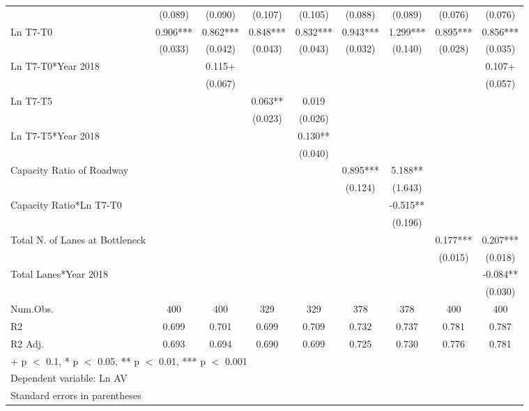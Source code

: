 \documentclass[
  letterpaper,
  authoryear]{elsarticle}
\begin{document}
\begin{table}
{\begin{tabular}[t]{lcccccccc}
 & (0.089) & (0.090) & (0.107) & (0.105) & (0.088) & (0.089) & (0.076) & (0.076)\\
Ln T7-T0 & 0.906*** & 0.862*** & 0.848*** & 0.832*** & 0.943*** & 1.299*** & 0.895*** & 0.856***\\
 & (0.033) & (0.042) & (0.043) & (0.043) & (0.032) & (0.140) & (0.028) & (0.035)\\
Ln T7-T0*Year 2018 &  & 0.115+ &  &  &  &  &  & 0.107+\\
 &  & (0.067) &  &  &  &  &  & (0.057)\\
Ln T7-T5 &  &  & 0.063** & 0.019 &  &  &  & \\
 &  &  & (0.023) & (0.026) &  &  &  & \\
Ln T7-T5*Year 2018 &  &  &  & 0.130** &  &  &  & \\
 &  &  &  & (0.040) &  &  &  & \\
Capacity Ratio of Roadway &  &  &  &  & 0.895*** & 5.188** &  & \\
 &  &  &  &  & (0.124) & (1.643) &  & \\
Capacity Ratio*Ln T7-T0 &  &  &  &  &  & -0.515** &  & \\
 &  &  &  &  &  & (0.196) &  & \\
Total N. of Lanes at Bottleneck &  &  &  &  &  &  & 0.177*** & 0.207***\\
 &  &  &  &  &  &  & (0.015) & (0.018)\\
Total Lanes*Year 2018 &  &  &  &  &  &  &  & -0.084**\\
 &  &  &  &  &  &  &  & (0.030)\\
\midrule
Num.Obs. & 400 & 400 & 329 & 329 & 378 & 378 & 400 & 400\\
R2 & 0.699 & 0.701 & 0.699 & 0.709 & 0.732 & 0.737 & 0.781 & 0.787\\
R2 Adj. & 0.693 & 0.694 & 0.690 & 0.699 & 0.725 & 0.730 & 0.776 & 0.781\\
\bottomrule
\multicolumn{9}{l}{\rule{0pt}{1em}+ p $<$ 0.1, * p $<$ 0.05, ** p $<$ 0.01, *** p $<$ 0.001}\\
\multicolumn{9}{l}{\rule{0pt}{1em}Dependent variable: Ln AV}\\
\multicolumn{9}{l}{\rule{0pt}{1em}Standard errors in parentheses}\\
\end{tabular}

}

\end{table}%
\end{document}
